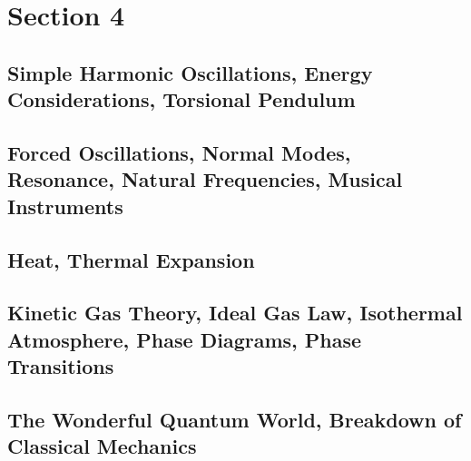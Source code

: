 \documentclass[../introphysics.tex]{subfiles}
\begin{document}
\chapter{Section 4}
\section{Simple Harmonic Oscillations, Energy Considerations, Torsional Pendulum}
\section{Forced Oscillations, Normal Modes, Resonance, Natural Frequencies, Musical Instruments}
\section{Heat, Thermal Expansion}
\section{Kinetic Gas Theory, Ideal Gas Law, Isothermal Atmosphere, Phase Diagrams, Phase Transitions}
\section{The Wonderful Quantum World, Breakdown of Classical Mechanics}
\end{document}
